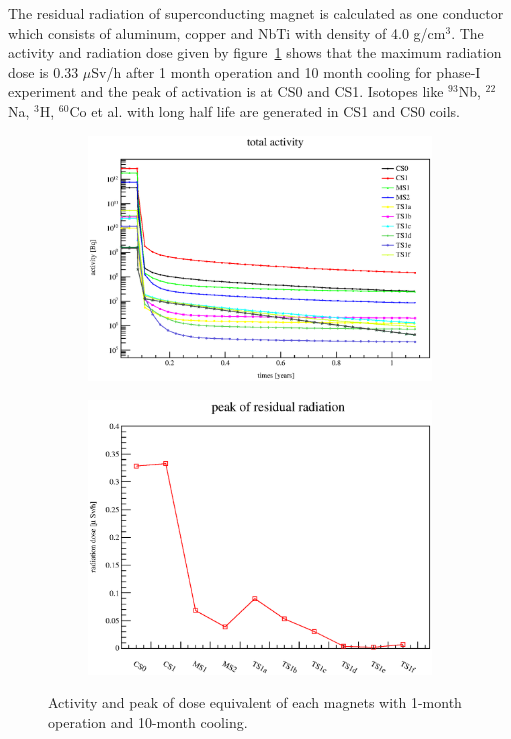 The residual radiation of superconducting magnet is calculated as one conductor which consists of aluminum, copper and NbTi with density of 4.0 g/cm$^3$.
The activity and radiation dose given by figure~\ref{2dose} shows that the maximum radiation dose is 0.33 $\mu$Sv/h after 1 month operation and 10 month cooling for phase-I experiment and the peak of activation is at CS0 and CS1.
Isotopes like $^{93}$Nb, $^{22}$Na, $^3$H, $^{60}$Co et al. with long half life are generated in CS1 and CS0 coils.
 \begin{figure}[H]
  \begin{subfigure}{0.3\textwidth}
   \centering
   \includegraphics[scale=0.45]{chapter3/fig/activity.eps}
  \end{subfigure}
  \hspace{0.2\textwidth}
  \begin{subfigure}{0.3\textwidth}
   \centering
   \includegraphics[scale=0.40]{chapter3/fig/dose.eps}
  \end{subfigure}
  \caption{Activity and peak of dose equivalent of each magnets with 1-month operation and 10-month cooling.}
  \label{2dose}
 \end{figure}

